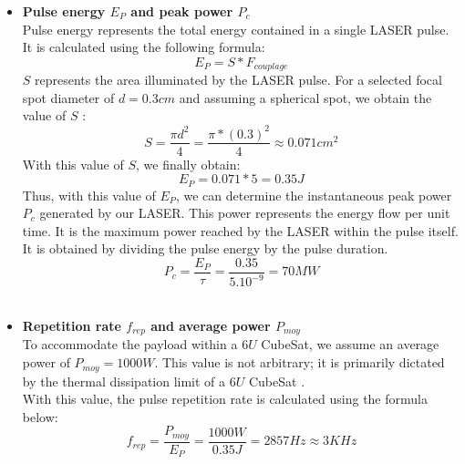 \begin{itemize}
    \item \textbf{Pulse energy \textbf{$E_{P}$} and peak power \textbf{$P_{c}$}}\\
    Pulse energy represents the total energy contained in a single LASER pulse. 
    It is calculated using the following formula: 
    \begin{equation}
        \boxed{E_{P} = S *  F_{couplage} }
    \end{equation}
    $S$ represents the area illuminated by the LASER pulse. 
    For a selected focal spot diameter of $d = 0.3 cm$ and assuming a spherical spot, we obtain the value of $S$ :  
    \begin{equation}
      \boxed{  S = \frac{\pi d^{2}}{4} =\frac{\pi * (0.3)^{2}}{4} \approx 0.071 cm^{2} }
    \end{equation}
    With this value of $S$, we finally obtain: 
    \begin{equation}
        \boxed{E_{P} = 0.071 *5 = 0.35J }
    \end{equation}
    Thus, with this value of $E_{P}$, we can determine the instantaneous peak power \textbf{$P_{c}$} generated by our LASER. This power represents the energy flow per unit time. It is the maximum power reached by the LASER within the pulse itself. It is obtained by dividing the pulse energy by the pulse duration. 
    \begin{equation}
        \boxed{P_{c} = \frac{E_{P}}{\tau} = \frac{0.35}{5.10^{-9}} = 70MW}
    \end{equation}
    \\
    \item \textbf{Repetition rate $f_{rep}$ and average power $P_{moy}$}\\
    To accommodate the payload within a $6U$ CubeSat, we assume an average power of $P_{moy} = 1000 W$. 
    This value is not arbitrary; it is primarily dictated by the thermal dissipation limit of a $6U$ CubeSat \cite{Bekey1997,Phipps2012}.\\
    With this value, the pulse repetition rate is calculated using the formula below: \\
    \begin{equation}
        \boxed{f_{rep} = \frac{P_{moy}}{E_{P}} = \frac{1000W}{0.35 J}  = 2857 Hz \approx 3KHz}
    \end{equation}
    
\end{itemize}

